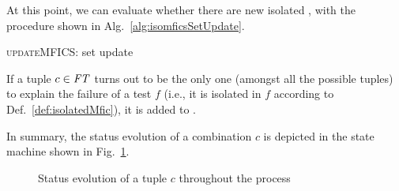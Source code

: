\begin{tikzborder}{\cite{Gargantini16:validation}}
\begin{tikzborder}{\cite{gargantini_combinatorial_2017}}
\begin{tikzborder}{\cite{gargantini_combinatorial_2017}}
\begin{tikzborder}{\cite{garn2019}}
\begin{tikzborder}{\cite{arcaini2019achieving}}
\begin{tikzborder}{}
At this point, we can evaluate whether there are new isolated \mfics, with the procedure shown in Alg.~\ref{alg:isomficsSetUpdate}.
\end{tikzborder}
%
\begin{algorithm}[!htb]
	\begin{algorithmic}[1]
		
		\EndIf
		\EndFor
	\end{algorithmic}
	\caption{\textsc{updateMFICS}: \isoMficsSet set update}
	\label{alg:isomficsSetUpdate}
\end{algorithm}
%
\begin{tikzborder}{}
If a tuple $c \in \mathit{FT}$ turns out to be the only one (amongst all the possible tuples) to explain the failure of a test $f$ (i.e., it is isolated in $f$ according to Def.~\ref{def:isolatedMfic}), it is added to \isoMficsSet.

In summary, the status evolution of a combination $c$ is depicted in the state machine shown in Fig.~\ref{fig:tupleLifeCycle}.
\end{tikzborder}
%
\begin{figure}[!htb]
	\centering
	\vspace{-50pt}
	\caption{Status evolution of a tuple $c$ throughout the process}
	\label{fig:tupleLifeCycle}
\end{figure}



\end{tikzborder}
\end{tikzborder}
\end{tikzborder}
\end{tikzborder}
\end{tikzborder}
